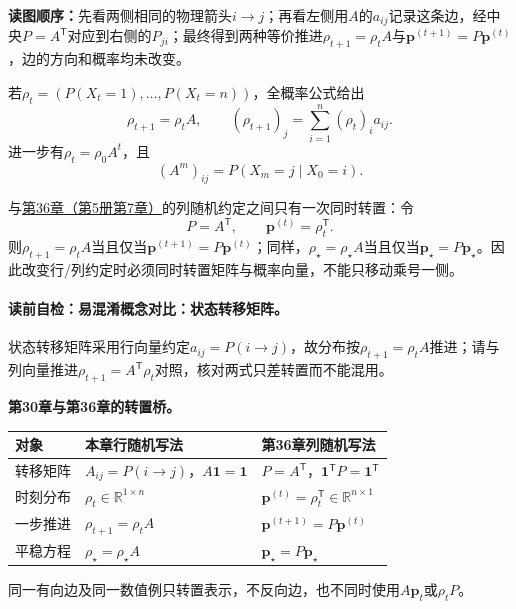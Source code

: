 \noindent\textbf{读图顺序：}先看两侧相同的物理箭头$i\to j$；再看左侧用$A$的$a_{ij}$记录这条边，经中央$P=A^{\mathsf T}$对应到右侧的$P_{ji}$；最终得到两种等价推进$\rho_{t+1}=\rho_tA$与$\boldsymbol p^{(t+1)}=P\boldsymbol p^{(t)}$，边的方向和概率均未改变。

若$\rho_t=(P(X_t=1),\ldots,P(X_t=n))$，全概率公式给出
\begin{equation}\label{eq:V5-C01-distribution-update}
\rho_{t+1}=\rho_tA,
\qquad
(\rho_{t+1})_j=\sum_{i=1}^n(\rho_t)_i a_{ij}.
\end{equation}
进一步有$\rho_t=\rho_0A^t$，且
\begin{equation}\label{eq:V5-C01-mstep}
(A^m)_{ij}=P(X_m=j\mid X_0=i).
\end{equation}

与\hyperref[chap:V5-C07]{第36章（第5册第7章）}的列随机\PageRank{}约定之间只有一次同时转置：令
\begin{equation}\label{eq:V5-C01-row-column-bridge}
P=A^{\mathsf T},\qquad
\boldsymbol p^{(t)}=\rho_t^{\mathsf T}.
\end{equation}
则$\rho_{t+1}=\rho_tA$当且仅当$\boldsymbol p^{(t+1)}=P\boldsymbol p^{(t)}$；同样，$\rho_\star=\rho_\star A$当且仅当$\boldsymbol p_\star=P\boldsymbol p_\star$。因此改变行/列约定时必须同时转置矩阵与概率向量，不能只移动乘号一侧。

\paragraph{读前自检：易混淆概念对比：状态转移矩阵。}状态转移矩阵采用行向量约定$a_{ij}=P(i\to j)$，故分布按$\rho_{t+1}=\rho_tA$推进；请与列向量推进$\rho_{t+1}=A^{\mathsf T}\rho_t$对照，核对两式只差转置而不能混用。\par

\begin{comparisonbox}
\textbf{第30章与第36章的转置桥。}\par\smallskip
\begin{tabularx}{\linewidth}{@{}l X X@{}}
\toprule 对象 & 本章行随机写法 & 第36章列随机写法\\ \midrule
转移矩阵 & $A_{ij}=P(i\to j)$，$A\boldsymbol1=\boldsymbol1$ & $P=A^{\mathsf T}$，$\boldsymbol1^{\mathsf T}P=\boldsymbol1^{\mathsf T}$\\
时刻分布 & $\rho_t\in\mathbb R^{1\times n}$ & $\boldsymbol p^{(t)}=\rho_t^{\mathsf T}\in\mathbb R^{n\times1}$\\
一步推进 & $\rho_{t+1}=\rho_tA$ & $\boldsymbol p^{(t+1)}=P\boldsymbol p^{(t)}$\\
平稳方程 & $\rho_\star=\rho_\star A$ & $\boldsymbol p_\star=P\boldsymbol p_\star$\\
\bottomrule
\end{tabularx}
同一有向边及同一数值例只转置表示，不反向边，也不同时使用$A\boldsymbol p_t$或$\rho_tP$。
\end{comparisonbox}

